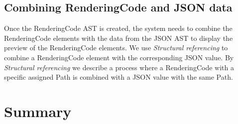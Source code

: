 \subsection{Combining RenderingCode and JSON data}
Once the RenderingCode AST is created, the system needs to combine the RenderingCode elements with the data from the JSON AST to display the preview of the RenderingCode elements.
We use \emph{Structural referencing} to combine a RenderingCode element with the corresponding JSON value.
By \emph{Structural referencing} we describe a process where a RenderingCode with a specific assigned Path is combined with a JSON value with the same Path.


\section{Summary}

